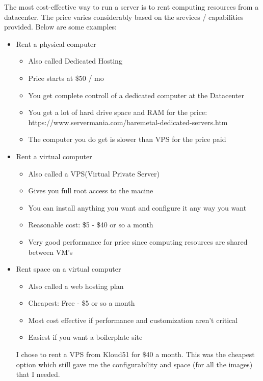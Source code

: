{The most cost-effective way to run a server is to rent computing resources from a datacenter.  The price varies considerably based on the srevices / capabilities provided.  Below are some examples:

\begin{itemize}
    \item Rent a physical computer
    \begin{itemize}
        \item Also called Dedicated Hosting
        \item Price starts at \$50 / mo
        \item You get complete controll of a dedicated computer at the Datacenter
        \item You get a lot of hard drive space and RAM for the price: https://www.servermania.com/baremetal-dedicated-servers.htm
        \item The computer you do get is slower than VPS for the price paid
    \end{itemize}

    \item Rent a virtual computer
    \begin{itemize}
        \item Also called a VPS(Virtual Private Server)
        \item Gives you full root access to the macine
        \item You can install anything you want and configure it any way you want
        \item Reasonable cost:  \$5 - \$40 or so a month
        \item Very good performance for price since computing resources are shared between VM's
    \end{itemize}

    \item Rent space on a virtual computer
    \begin{itemize}
        \item Also called a web hosting plan
        \item Cheapest:  Free - \$5 or so a month
        \item Most cost effective if performance and customization aren't critical
        \item Easiest if you want a boilerplate site
        
    \end{itemize}

    I chose to rent a VPS from Kloud51 for \$40 a month.  This was the cheapest option which still gave me the configurability and space (for all the images) that I needed.
    

\end{itemize}}

